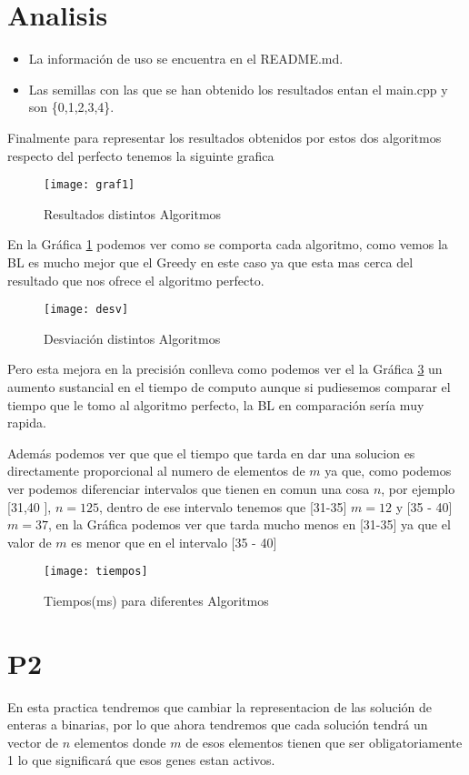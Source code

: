 \section{Analisis}
\begin{itemize}
  \item La información de uso se encuentra en el README.md.
  \item Las semillas con las que se han obtenido los resultados entan el main.cpp y son \{0,1,2,3,4\}.
\end{itemize}

Finalmente para representar los resultados obtenidos por estos dos algoritmos respecto del perfecto tenemos la siguinte grafica
\begin{figure}[h]
  \centering
  \texttt{[image: graf1]}
  \caption{Resultados distintos Algoritmos}
  \label{gra}
\end{figure}


En la Gráfica \ref{gra} podemos ver como se comporta cada algoritmo, como vemos la BL es mucho mejor que el Greedy en este caso ya que 
esta mas cerca del resultado que nos ofrece el algoritmo perfecto.\newpage


\begin{figure}[h]
  \centering
  \texttt{[image: desv]}
  \caption{Desviación distintos Algoritmos}
  \label{gra2}
\end{figure}

Pero esta mejora en la precisión conlleva como podemos ver el la Gráfica \ref{gra3} un aumento sustancial en el tiempo de computo
aunque si pudiesemos comparar el tiempo que le tomo al algoritmo perfecto, la BL en comparación sería muy rapida.

Además podemos ver que que el tiempo que tarda en dar una solucion es directamente proporcional al numero de elementos de $m$ ya
que, como podemos ver podemos diferenciar intervalos que tienen en comun una cosa $n$, por ejemplo [31,40 ], $n = 125$, dentro de ese
intervalo tenemos que [31-35] $m =12 $ y [35 - 40] $m =37 $, en la Gráfica podemos ver que tarda mucho menos en [31-35]
ya que el valor de $m$ es menor que en el intervalo [35 - 40]

\begin{figure}[h]
  \centering
  \texttt{[image: tiempos]}
  \caption{Tiempos(ms) para diferentes Algoritmos}
  \label{gra3}
\end{figure}


\section{P2}
En esta practica tendremos que cambiar la representacion de las solución de enteras a binarias, por lo
que ahora tendremos que cada solución tendrá un vector de $n$ elementos donde $m$ de esos elementos tienen que ser
obligatoriamente 1 lo que significará que esos genes estan activos.

